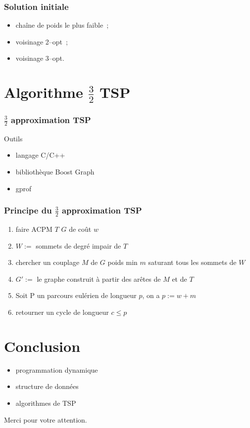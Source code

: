 \documentclass[french]{beamer}
\begin{document}
\begin{frame}
  \frametitle{Solution initiale}
  \begin{itemize}
  \item chaîne de poids le plus faible~;
  \item voisinage 2--opt~;
  \item voisinage 3--opt.
  \end{itemize}
\end{frame}

\section{Algorithme $\frac{3}{2}$ TSP}

\begin{frame}
\frametitle{$\frac{3}{2}$ approximation TSP}
\begin{block}{Outils}
  \begin{itemize}
  \item langage C/C++
  \item bibliothèque Boost Graph
  \item gprof
  \end{itemize}
\end{block}
\end{frame}

\begin{frame}
\frametitle{Principe du $\frac{3}{2}$ approximation TSP}
\begin{enumerate}
\item faire ACPM $T$ $G$ de coût $w$
\item $W := $ sommets de degré impair de $T$
\item chercher un couplage $M$ de $G$ poids min $m$ saturant tous les
sommets de $W$
\item $G' := $ le graphe construit à partir des arêtes de $M$ et de
$T$
\item Soit P un parcours eulérien de longueur $p$, on a $p:= w + m$
\item retourner un cycle de longueur $c \leq p$
\end{enumerate}
\end{frame}

\section{Conclusion}
\begin{frame}
\begin{itemize}
\item programmation dynamique
\item structure de données
\item algorithmes de TSP
\end{itemize}
\end{frame}


\begin{frame}
  \begin{center}
    Merci pour votre attention.
  \end{center}
\end{frame}
\end{document}
